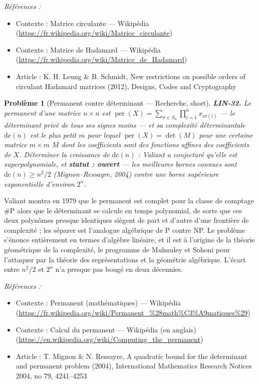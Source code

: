 \documentclass[11pt]{article}
\newtheorem{problem}{Problème}
\newenvironment{refs}{\par\small\noindent\emph{Références :}\begin{itemize}\setlength\itemsep{0pt}}{\end{itemize}\normalsize}
\begin{document}
\begin{refs}
\item Contexte : Matrice circulante --- Wikipédia (\url{https://fr.wikipedia.org/wiki/Matrice_circulante})
\item Contexte : Matrice de Hadamard --- Wikipédia (\url{https://fr.wikipedia.org/wiki/Matrice_de_Hadamard})
\item Article : K. H. Leung \& B. Schmidt, \og{} New restrictions on possible orders of circulant Hadamard matrices \fg{} (2012), Designs, Codes and Cryptography
\end{refs}

\bigskip

\begin{problem}[{Permanent contre déterminant --- Recherche, short}]
\textbf{LIN-32.} Le permanent d'une matrice $n \times n$ est
$\operatorname{per}(X) = \sum_{\sigma \in S_n} \prod_{i=1}^{n} x_{i \sigma(i)}$ --- le déterminant
privé de tous ses signes moins --- et sa \textit{complexité déterminantale} $\mathrm{dc}(n)$ est le plus
petit $m$ pour lequel $\operatorname{per}(X) = \det(M)$ pour une certaine matrice $m \times m$
$M$ dont les coefficients sont des fonctions affines des coefficients de $X$. Déterminer la
croissance de $\mathrm{dc}(n)$ : Valiant a conjecturé qu'elle est superpolynomiale, et
\textbf{statut : ouvert} --- les meilleures bornes connues sont $\mathrm{dc}(n) \ge n^2/2$
(Mignon--Ressayre, 2004) contre une borne supérieure exponentielle d'environ $2^n$.
\end{problem}

\noindent Valiant montra en 1979 que le permanent est complet pour la classe de comptage
$\#\mathrm{P}$ alors que le déterminant se calcule en temps polynomial, de sorte que ces deux
polynômes presque identiques siègent de part et d'autre d'une frontière de complexité ; les séparer
est l'analogue algébrique de P contre NP. Le problème s'énonce entièrement en termes d'algèbre
linéaire, et il est à l'origine de la théorie géométrique de la complexité, le programme de Mulmuley
et Sohoni pour l'attaquer par la théorie des représentations et la géométrie algébrique. L'écart entre
$n^2/2$ et $2^n$ n'a presque pas bougé en deux décennies.

\begin{refs}
\item Contexte : Permanent (mathématiques) --- Wikipédia (\url{https://fr.wikipedia.org/wiki/Permanent_%28math%C3%A9matiques%29})
\item Contexte : Calcul du permanent --- Wikipédia (en anglais) (\url{https://en.wikipedia.org/wiki/Computing_the_permanent})
\item Article : T. Mignon \& N. Ressayre, \og{} A quadratic bound for the determinant and permanent problem \fg{} (2004), International Mathematics Research Notices 2004, no 79, 4241--4253
\end{refs}
\end{document}
